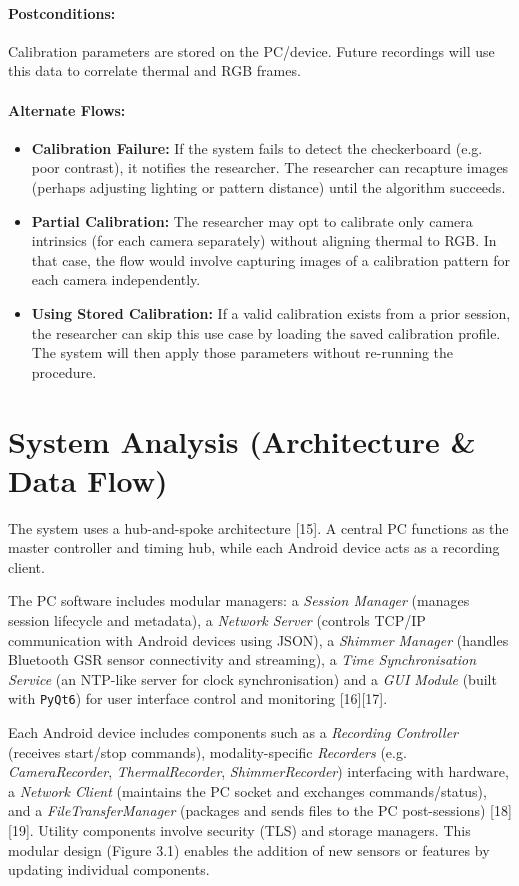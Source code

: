 \paragraph{Postconditions:} Calibration parameters are stored on the PC/device. Future recordings will use this data to correlate thermal and RGB frames.

\paragraph{Alternate Flows:}
\begin{itemize}
	\item \textbf{Calibration Failure:} If the system fails to detect the checkerboard (e.g. poor contrast), it notifies the researcher. The researcher can recapture images (perhaps adjusting lighting or pattern distance) until the algorithm succeeds.
	\item \textbf{Partial Calibration:} The researcher may opt to calibrate only camera intrinsics (for each camera separately) without aligning thermal to RGB. In that case, the flow would involve capturing images of a calibration pattern for each camera independently.
	\item \textbf{Using Stored Calibration:} If a valid calibration exists from a prior session, the researcher can skip this use case by loading the saved calibration profile. The system will then apply those parameters without re-running the procedure.
\end{itemize}


\section{System Analysis (Architecture \& Data Flow)}

The system uses a hub-and-spoke architecture [15]. A central PC functions as the master controller and timing hub, while each Android device acts as a recording client.

The PC software includes modular managers: a \textit{Session Manager} (manages session lifecycle and metadata), a \textit{Network Server} (controls TCP/IP communication with Android devices using JSON), a \textit{Shimmer Manager} (handles Bluetooth GSR sensor connectivity and streaming), a \textit{Time Synchronisation Service} (an NTP-like server for clock synchronisation) and a \textit{GUI Module} (built with \texttt{PyQt6}) for user interface control and monitoring [16][17].

Each Android device includes components such as a \textit{Recording Controller} (receives start/stop commands), modality-specific \textit{Recorders} (e.g. \textit{CameraRecorder}, \textit{ThermalRecorder}, \textit{ShimmerRecorder}) interfacing with hardware, a \textit{Network Client} (maintains the PC socket and exchanges commands/status), and a \textit{FileTransferManager} (packages and sends files to the PC post-sessions) [18][19]. Utility components involve security (TLS) and storage managers. This modular design (Figure 3.1) enables the addition of new sensors or features by updating individual components.


